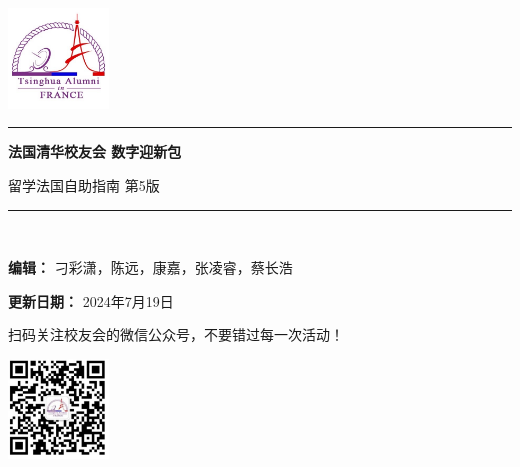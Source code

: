 \documentclass[UTF8]{ctexart}
\newcommand\titleofdoc{\bfseries 法国清华校友会 数字迎新包}
\begin{document}
\begin{titlepage}
   \begin{center}
   
        \vspace{4 cm} 
        
        {\includegraphics[width=0.2\textwidth]{images/Logo.jpg}}\\

        \vspace{0.5 cm} 
        
        \noindent\rule[0.25\baselineskip]{\textwidth}{1pt}
        
        \vspace{0.5 cm} 
        
        \Huge{\titleofdoc} 

        \vspace{0.5cm}
        
        \LARGE{留学法国自助指南 第5版}
        
        \vspace{1 cm} 
        
        \noindent\rule[0.25\baselineskip]{\textwidth}{1pt}\\
        
        \vspace{1 cm}

        \large{\textbf{编辑：} 刁彩潇，陈远，康嘉，张凌睿，蔡长浩}\\

        \vspace{0.3 cm}

        \large{\textbf{更新日期：} 2024年7月19日}\\

        \vspace{1 cm}

        \large{扫码关注校友会的微信公众号，不要错过每一次活动！}\\

        \vspace{0.5 cm} 
        
        {\includegraphics[width=0.2\textwidth]{images/QRcode.png}}\\


\end{center}
\end{titlepage}
\end{document}
